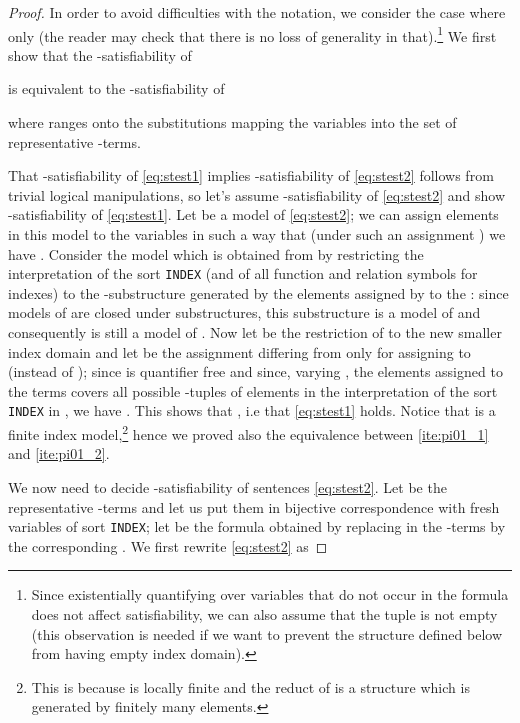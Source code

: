 \documentclass{LMCS}
\theoremstyle{plain}\newtheorem{assumption}[thm]{Assumption}
\theoremstyle{plain}\newtheorem{proposition}[thm]{Proposition}
\theoremstyle{plain}\newtheorem{property}[thm]{Property}
\theoremstyle{plain}\newtheorem{example}[thm]{Example}
\theoremstyle{plain}\newtheorem{claim}[thm]{Claim}
\theoremstyle{plain}\newtheorem{lemma}[thm]{Lemma}
\begin{document}
\begin{proof}
  In order to avoid difficulties with the notation, we consider the
  case where  only (the reader may check that there is no loss of
  generality in that).\footnote{Since existentially quantifying over
    variables that do not occur in the formula does not affect
    satisfiability, we can also assume that the tuple  is not
    empty (this observation is needed if we want to prevent the
    structure  defined below from having empty index domain).} We
  first show that the -satisfiability of
  
  is equivalent to the -satisfiability of
  
  where  ranges onto the substitutions mapping the variables
   into the set of representative -terms.

  That -satisfiability of \eqref{eq:stest1} implies
  -satisfiability of \eqref{eq:stest2} follows from trivial
  logical manipulations, so let's assume -satisfiability of
  \eqref{eq:stest2} and show -satisfiability of
  \eqref{eq:stest1}. Let  be a model of \eqref{eq:stest2}; we can
  assign elements in this model to the variables  in such
  a way that (under such an assignment ) we have . Consider the model  which is obtained
  from  by restricting the interpretation of the sort {\tt INDEX}
  (and of all function and relation symbols for indexes) to the
  -substructure generated by the elements assigned by  to the : since models of  are closed under
  substructures, this substructure is a model of  and
  consequently  is still a model of . Now let  be the
  restriction of  to the new smaller index domain and let
   be the assignment differing from  only for
  assigning  to  (instead of ); since  is
  quantifier free and since, varying , the elements assigned
  to the terms  covers all possible -tuples of
  elements in the interpretation of the sort {\tt INDEX} in , we
  have . This shows that , i.e that
  \eqref{eq:stest1} holds. Notice that  is a finite index
  model,\footnote{This is because  is locally finite and the
     reduct of  is a structure which is generated by
    finitely many elements.} hence we proved also the equivalence
  between \eqref{ite:pi01_1} and \eqref{ite:pi01_2}.
 
  We now need to decide -satisfiability of sentences
  \eqref{eq:stest2}. Let  be the representative
  -terms and let us put them in bijective correspondence
  with fresh variables  of sort {\tt INDEX}; let
   be the formula
  obtained by replacing in  the -terms  by the
  corresponding . We first rewrite \eqref{eq:stest2} as


\end{proof}
\end{document}
